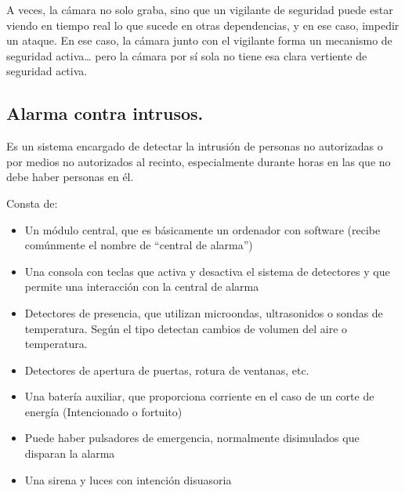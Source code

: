 \documentclass{article}
\begin{document}
A veces, la cámara no solo graba, sino que un vigilante de seguridad puede estar viendo en tiempo real lo que sucede en otras dependencias, y en ese caso, impedir un ataque. En ese caso, la cámara junto con el vigilante forma un mecanismo de seguridad activa\ldots{} pero la cámara por sí sola no tiene esa clara vertiente de seguridad activa.





\subsection{Alarma contra intrusos.}
\label{sec:org4ad7c9c}
Es un sistema encargado de detectar la intrusión de personas no autorizadas o por medios no autorizados al recinto, especialmente durante horas en las que no debe haber personas en él.



Consta de:
\begin{itemize}
\item Un módulo central, que es básicamente un ordenador con software (recibe comúnmente el nombre de “central de alarma”)
\item Una consola con teclas que activa y desactiva el sistema de detectores y que permite una interacción con la central de alarma
\item Detectores de presencia, que utilizan microondas, ultrasonidos o sondas de temperatura. Según el tipo detectan cambios de volumen del aire o temperatura.
\item Detectores de apertura de puertas, rotura de ventanas, etc.
\item Una batería auxiliar, que proporciona corriente en el caso de un corte de energía (Intencionado o fortuito)
\item Puede haber pulsadores de emergencia, normalmente disimulados que disparan la alarma
\item Una sirena y luces con intención disuasoria
\end{itemize}
\end{document}
